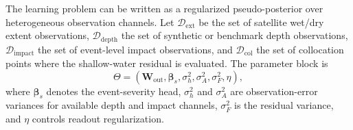 \documentclass[pdflatex,sn-mathphys-ay]{sn-jnl}
\theoremstyle{thmstyleone}
\begin{document}
The learning problem can be written as a regularized
pseudo-posterior over heterogeneous observation channels.  Let
$\mathcal{D}_{\mathrm{ext}}$ be the set of satellite wet/dry extent
observations, $\mathcal{D}_{\mathrm{depth}}$ the set of synthetic or
benchmark depth observations, $\mathcal{D}_{\mathrm{impact}}$ the set
of event-level impact observations, and $\mathcal{D}_{\mathrm{col}}$
the set of collocation points where the shallow-water residual is
evaluated.  The parameter block is
\begin{equation}
  \Theta
  =
  \left(
    \mathbf{W}_{\mathrm{out}},
    \boldsymbol{\beta}_{s},
    \sigma^{2}_{h},
    \sigma^{2}_{A},
    \sigma^{2}_{F},
    \eta
  \right),
  \label{eq:padr_parameter_block}
\end{equation}
where $\boldsymbol{\beta}_{s}$ denotes the event-severity head,
$\sigma_h^2$ and $\sigma_A^2$ are observation-error variances for
available depth and impact channels, $\sigma_F^2$ is the residual
variance, and $\eta$ controls readout regularization.
\end{document}

